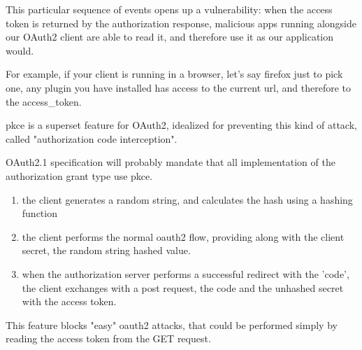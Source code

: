 This particular sequence of events opens up a vulnerability:
when the access token is returned by the authorization response, malicious apps
running alongside our OAuth2 client are able to read it, and therefore use it as
our application would.

For example, if your client is running in a browser, let's say firefox just to
pick one, any plugin you have installed has access to the current url, and
therefore to the access\_token.

\ac{pkce} is a superset feature for OAuth2, idealized for preventing this kind of
attack, called "authorization code interception".

OAuth2.1 specification will probably mandate that all implementation of the authorization
grant type use \ac{pkce}.

\begin{enumerate}
    \item the client generates a random string, and calculates the hash using a
        hashing function
    \item the client performs the normal oauth2 flow, providing along with the
        client secret, the random string hashed value.
    \item when the authorization server performs a successful redirect with the
        'code', the client exchanges with a post request, the code and the
        unhashed secret with the access token.
\end{enumerate}

This feature blocks "easy" oauth2 attacks, that could be performed simply by
reading the access token from the GET request.


